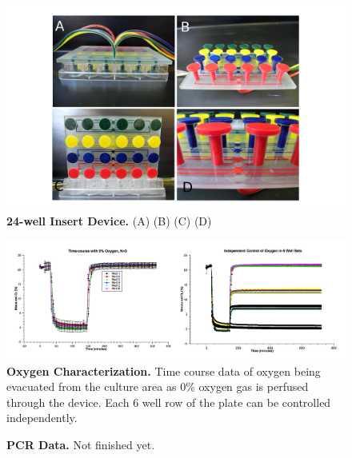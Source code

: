 \documentclass[]{article}
\begin{document}
\begin{figure}[H]
\includegraphics[scale=0.2]{fig2.png} 
\caption{
{\bf 24-well Insert Device.}
(A) 
(B) 
(C) 
(D) 
}
\label{figure2}
\end{figure}

\begin{figure}[H]
\includegraphics[scale=0.25]{fig3.png}
\caption{
{\bf Oxygen Characterization.}  Time course data of oxygen being evacuated from the culture area as 0\% oxygen gas is perfused through the device. Each 6 well row of the plate can be controlled independently.  
}
\label{figure3}
\end{figure}

\begin{figure}[H]
\caption{
{\bf PCR Data.}  Not finished yet.  
}
\label{pcr-data}
\end{figure}



\end{document}
